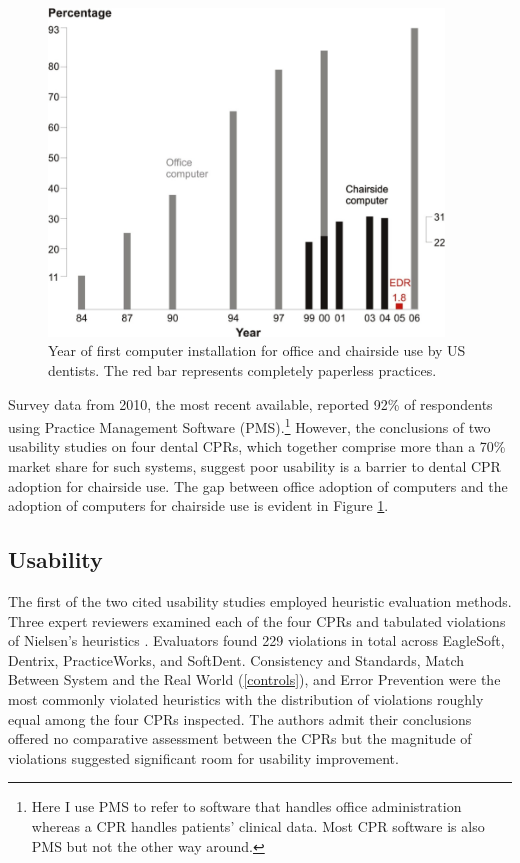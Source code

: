 \documentclass[11pt]{article}
\begin{document}
\begin{figure}[h!]
\begin{center}
\includegraphics[width=105mm]{comp.png}
\end{center}
\caption{Year of first computer installation for office and chairside use by US dentists\cite{Schleyer2006Clinical-Comput}. The red bar represents completely paperless practices.}
\label{adoption}
\end{figure} 
\newpage

\noindent Survey data from 2010, the most recent available, reported 92\% of respondents using Practice Management Software (PMS)\cite{Levine2010}.\footnote[2]{Here I use PMS to refer to software that handles office administration whereas a CPR handles patients' clinical data. Most CPR software is also PMS but not the other way around.} However, the conclusions of two usability studies on four dental CPRs, which together comprise more than a 70\% market share for such systems, suggest poor usability is a barrier to dental CPR adoption for chairside use\cite{Thyvalikakath2007Heuristic-evalu,Thyvalikakath2008A-usability-eva}. The gap between office adoption of computers and the adoption of computers for chairside use is evident in Figure \ref{adoption}.

\subsection{Usability}
The first of the two cited usability studies employed heuristic evaluation methods\cite{Nielsen1994Usability-Inspe, Schleyer:2007fk}. Three expert reviewers examined each of the four CPRs and tabulated violations of Nielsen's heuristics \cite{Thyvalikakath:2009fk}. Evaluators found 229 violations in total across EagleSoft, Dentrix, PracticeWorks, and SoftDent. Consistency and Standards, Match Between System and the Real World (\ref{controls}), and Error Prevention were the most commonly violated heuristics  with the distribution of violations roughly equal among the four CPRs inspected. The authors admit their conclusions offered no comparative assessment between the CPRs but the magnitude of violations suggested significant room for usability improvement.
\end{document}
